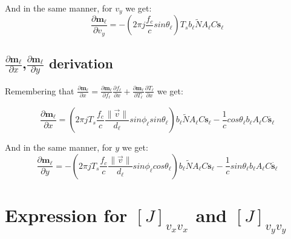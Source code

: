 \documentclass[10pt,a4paper]{report}
\begin{document}
And in the same manner, for $v_y$ we get:
\begin{equation}
\frac{\partial \mathbf{m_\ell }}{\partial v_y} = -(2 \pi j \frac{f_c}{c} sin\theta_\ell ) T_s b_\ell  \tilde{N} A_\ell  C \mathbf{s_\ell }
\end{equation}

\subsection{$\frac{\partial \mathbf{m_\ell }}{\partial x}$,$\frac{\partial \mathbf{m_\ell }}{\partial y}$ derivation}
Remembering that 
$\frac{\partial \mathbf{m_\ell }}{\partial x} = \frac{\partial \mathbf{m_\ell }}{\partial f_\ell }\frac{\partial f_\ell }{\partial x} + \frac{\partial \mathbf{m_\ell }}{\partial T_\ell }\frac{\partial T_\ell }{\partial x}$
we get:

\begin{equation}
\frac{\partial \mathbf{m_\ell }}{\partial x} = (2 \pi j T_s \frac{f_c}{c} \frac{\|\vec{v}\|}{d_\ell } sin\phi_\ell  sin\theta_\ell )b_\ell  \tilde{N} A_\ell  C \mathbf{s_\ell } -\frac{1}{c}cos\theta_\ell  b_\ell  A_\ell  C \dot{\mathbf{s_\ell }}
\end{equation}

And in the same manner, for $y$ we get:
\begin{equation}
\frac{\partial \mathbf{m_\ell }}{\partial y} = -(2 \pi j T_s \frac{f_c}{c} \frac{\|\vec{v}\|}{d_\ell } sin\phi_\ell  cos\theta_\ell )b_\ell  \tilde{N} A_\ell  C \mathbf{s_\ell } -\frac{1}{c}sin\theta_\ell  b_\ell  A_\ell  C \dot{\mathbf{s_\ell }}
\end{equation}


\section{Expression for $[J]_{v_x v_x}$ and $[J]_{v_y v_y}$ }
\end{document}
